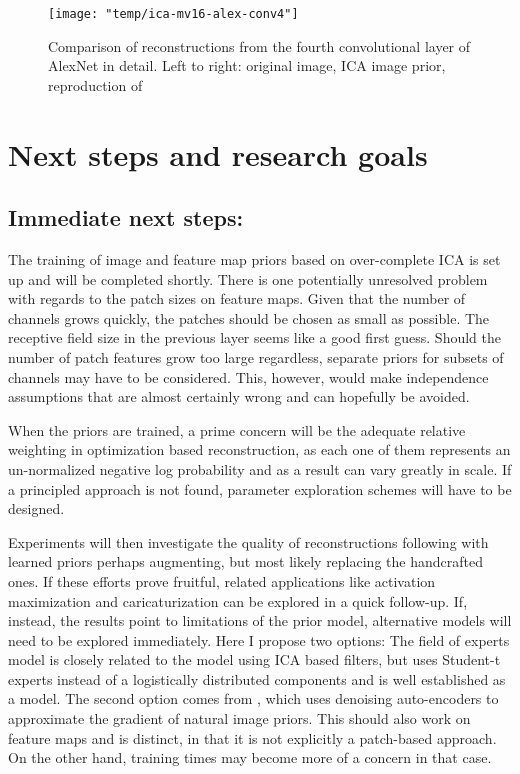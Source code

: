 \documentclass{article}
\begin{document}
\begin{figure}
	\centering
	\texttt{[image: "temp/ica-mv16-alex-conv4"]}
	\caption{Comparison of reconstructions from the fourth convolutional layer of AlexNet in detail. Left to right: original image, ICA image prior, reproduction of \cite{mv15}}
	\label{fig:ica_mv_l4}
\end{figure}



\FloatBarrier
\section{Next steps and research goals}

\subsection{Immediate next steps:}

The training of image and feature map priors based on over-complete ICA is set up and will be completed shortly. There is one potentially unresolved problem with regards to the patch sizes on feature maps. Given that the number of channels grows quickly, the patches should be chosen as small as possible. The receptive field size in the previous layer seems like a good first guess. Should the number of patch features grow too large regardless, separate priors for subsets of channels may have to be considered. This, however, would make independence assumptions that are almost certainly wrong and can hopefully be avoided. 

When the priors are trained, a prime concern will be the adequate relative weighting in optimization based reconstruction, as each one of them represents an un-normalized negative log probability and as a result can vary greatly in scale. If a principled approach is not found, parameter exploration schemes will have to be designed.

Experiments will then investigate the quality of reconstructions following \cite{mv16} with learned priors perhaps augmenting, but most likely replacing the handcrafted ones.
If these efforts prove fruitful, related applications like activation maximization and caricaturization \cite{mv16} can be explored in a quick follow-up. If, instead, the results point to limitations of the prior model, alternative models will need to be explored immediately. Here I propose two options: The field of experts model is closely related to the model using ICA based filters, but uses Student-t experts instead of a logistically distributed components and is well established as a model. The second option comes from \cite{plugnplay}, which uses denoising auto-encoders to approximate the gradient of natural image priors. This should also work on feature maps and is distinct, in that it is not explicitly a patch-based approach. On the other hand, training times may become more of a concern in that case.
\end{document}
